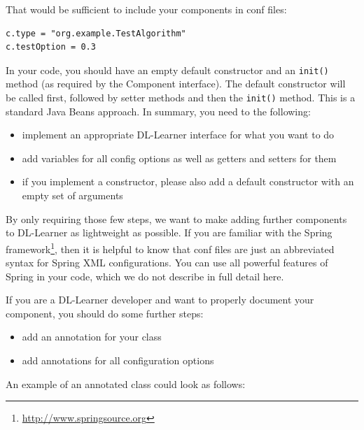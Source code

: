\documentclass[a4paper,12pt]{scrartcl}
\begin{document}
That would be sufficient to include your components in conf files:
\begin{verbatim}
c.type = "org.example.TestAlgorithm"
c.testOption = 0.3
\end{verbatim}

In your code, you should have an empty default constructor and an \verb|init()| method (as required by the Component interface). The default constructor will be called first, followed by setter methods and then the \verb|init()| method. This is a standard Java Beans approach. In summary, you need to the following:
\begin{itemize}
	\item implement an appropriate DL-Learner interface for what you want to do
	\item add variables for all config options as well as getters and setters for them
	\item if you implement a constructor, please also add a default constructor with an empty set of arguments
\end{itemize}

By only requiring those few steps, we want to make adding further components to DL-Learner as lightweight as possible.
If you are familiar with the Spring framework\footnote{\url{http://www.springsource.org}}, then it is helpful to know that conf files are just an abbreviated syntax for Spring XML configurations. You can use all powerful features of Spring in your code, which we do not describe in full detail here. 
%
%

If you are a DL-Learner developer and want to properly document your component, you should do some further steps:
\begin{itemize}
	\item add an annotation for your class
	\item add annotations for all configuration options
\end{itemize}

An example of an annotated class could look as follows:
\end{document}
